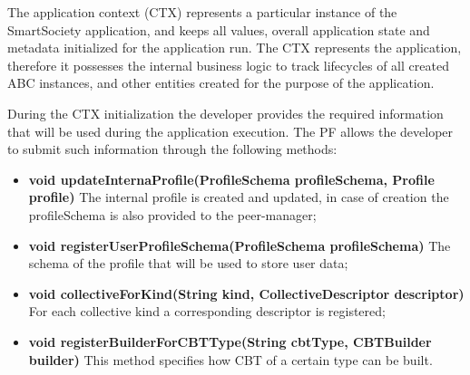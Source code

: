  

The application context (CTX) represents a particular instance of the SmartSociety application, and keeps all values, overall application state and metadata initialized for the application run. 
The CTX represents the application, therefore it possesses the internal business logic to track lifecycles of all created ABC instances, and other entities created for the purpose of the application.

During the CTX initialization the developer provides the required information that will be used during the application execution. The PF allows the developer to submit such information through the following methods:
\begin{itemize}
\item {\bf void updateInternaProfile(ProfileSchema profileSchema, Profile profile)} The internal profile is created and updated, in case of creation the profileSchema is also provided to the peer-manager;
\item {\bf void registerUserProfileSchema(ProfileSchema profileSchema)} The schema of the profile that will be used to store user data;
\item {\bf void collectiveForKind(String kind, CollectiveDescriptor descriptor)} For each collective kind a corresponding descriptor is registered;
\item {\bf void registerBuilderForCBTType(String cbtType, CBTBuilder builder)} This method specifies how CBT of a certain type can be built. 
\end{itemize}

